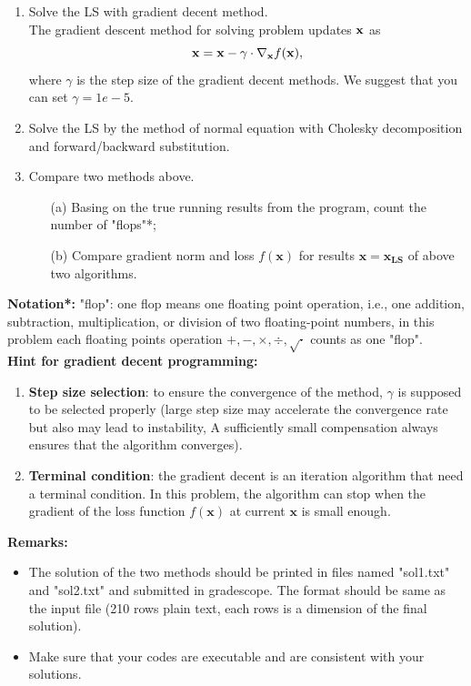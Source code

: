 \documentclass[english,onecolumn]{IEEEtran}
\begin{document}
\begin{enumerate}
    \item Solve the LS with gradient decent method.\\
    The gradient descent method for solving problem updates $ {\bf x}$ as
    $$
        {\bf x} = {\bf x} - \gamma \cdot \nabla_{{\bf x}} f(\mathbf{x}),
    $$
    where $\gamma$ is the step size of the gradient decent methods. We suggest that you can set $\gamma=1e-5$.
    \item Solve the LS by the method of normal equation with Cholesky decomposition and forward/backward substitution.
    \item Compare two methods above. 
    \begin{enumerate}
        \item[(a)] Basing on the true running results from the program, count the number of "flops"*;
        \item[(b)] Compare gradient norm and loss $f(\mathbf{x})$ for results $\mathbf{x}=\mathbf{x_{LS}}$ of above two algorithms.
    \end{enumerate}
\end{enumerate}
    \textbf{Notation*:} "flop": one flop means one floating point operation, i.e., one addition, subtraction, multiplication, or division of two floating-point numbers, in this problem each floating points operation $+,-,\times, \div, \sqrt{\cdot}$ counts as one "flop". \\
    \textbf{Hint for gradient decent programming:} 
    \begin{enumerate}
        \item \textbf{Step size selection}: to ensure the convergence of the method, $\gamma$ is supposed to be selected properly (large step size may accelerate the convergence rate but also may lead to instability, A sufficiently small compensation always ensures that the algorithm converges). 
        \item \textbf{Terminal condition}: the gradient decent is an iteration algorithm that need a terminal condition. In this problem, the algorithm can stop when the gradient of the loss function $f(\mathbf{x})$ at current $\mathbf{x}$ is small enough.
    \end{enumerate}
    \noindent\textbf{Remarks: }
   \begin{itemize}
    \item The solution of the two methods should be printed in files named "sol1.txt" and "sol2.txt" and submitted in gradescope.  The format should be same as the input file (210 rows plain text, each rows is a dimension of the final solution).
    \item Make sure that your codes are executable and are consistent with your solutions.
   \end{itemize}
\end{document}
